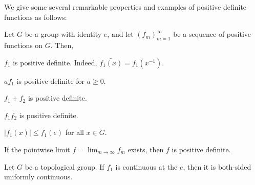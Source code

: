 \documentclass[12pt]{article}
\begin{document}
We give some several remarkable properties and examples of positive definite functions as follows:

\begin{prop}
Let $G$ be a group with identity $e$, and let $(f_m)_{m=1}^\infty$ be a sequence of positive functions on $G$.
Then,
\begin{parts}
\item $\bar f_1$ is positive definite. Indeed, $\bar{f_1(x)}=f_1(x^{-1})$.
\item $af_1$ is positive definite for $a\ge0$.
\item $f_1+f_2$ is positive definite.
\item $f_1f_2$ is positive definite.
\item $|f_1(x)|\le f_1(e)$ for all $x\in G$.
\item If the pointwise limit $f=\lim_{m\to\infty}f_m$ exists, then $f$ is positive definite.
\item Let $G$ be a topological group. If $f_1$ is continuous at the $e$, then it is both-sided uniformly continuous.
\end{parts}
\end{prop}
\end{document}
